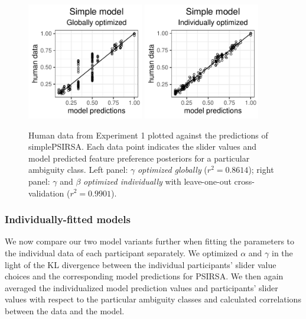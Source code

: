 \documentclass[11pt,a4paper]{article}
\newcommand{\gcs}[1]{\textcolor{blue}{[gcs: #1]}}
\begin{document}
\begin{figure}[ht]
	\centering
	\includegraphics[width=2in]{images/m13.pdf}
	\includegraphics[width=2in]{images/m8.pdf}
		\caption{Human data from Experiment 1 plotted against the predictions of simplePSIRSA. %
		Each data point indicates the slider values and model predicted feature preference posteriors for a particular ambiguity class.
		Left panel: $\gamma$ \emph{optimized globally} ($r^2 = 0.8614$); 
		right panel: $\gamma$ and $\beta$ \emph{optimized individually} with leave-one-out cross-validation ($r^{2}=0.9901$).
	}
		\label{simple-global-and-cross-validated}
\end{figure}


\subsubsection{Individually-fitted models}

We now compare our two model variants further when fitting the parameters to the individual data of each participant separately. 
We optimized $\alpha$ and $\gamma$ in the light of the KL divergence between the individual participants' slider value choices and the corresponding model predictions for PSIRSA.
We then again averaged the individualized model prediction values and participants' slider values with respect to the particular ambiguity classes and calculated correlations between the data and the model.
\end{document}
